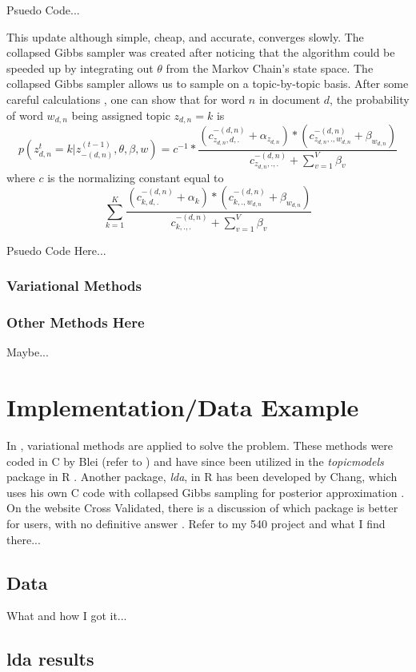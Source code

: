 \documentclass[3p,times]{elsarticle}
\begin{document}
Psuedo Code...

This update although simple, cheap, and accurate, converges slowly. The collapsed Gibbs sampler was created after noticing that the algorithm could be speeded up by integrating out $\theta$ from the Markov Chain's state space. The collapsed Gibbs sampler allows us to sample on a topic-by-topic basis. After some careful calculations \cite{multinom}, one can show that for word $n$ in document $d$, the probability of word $w_{d,n}$ being assigned topic $z_{d,n}=k$ is 
\\
$$
p( z^{t}_{d,n}=k| z^{(t-1)}_{-(d,n)}, \theta, \beta, w) =c^{-1}*\frac{(c^{-(d,n)}_{z_{d,n},d,.}+\alpha_{z_{d,n}})*(c^{-(d,n)}_{z_{d,n},.,w_{d,n}}+\beta_{w_{d,n}})}{c^{-(d,n)}_{z_{d,n},.,.}+\sum_{v=1}^{V}{\beta_{v}}} 
$$
where $c$ is the normalizing constant equal to 
$$
\sum_{k=1}^{K}{\frac{(c^{-(d,n)}_{k,d,.}+\alpha_{k})*(c^{-(d,n)}_{k,.,w_{d,n}}+\beta_{w_{d,n}})}{c^{-(d,n)}_{k,.,.}+\sum_{v=1}^{V}{\beta_{v}}}} 
$$

Psuedo Code Here...
\subsubsection{Variational Methods}


\subsubsection{Other Methods Here}
Maybe...
\section{Implementation/Data Example}
In \cite{lda}, variational methods are applied to solve the problem. These methods were coded in C by Blei (refer to \cite{Ccode}) and have since been utilized in the \textit{topicmodels} package in R \cite{topicsR}. Another package, \textit{lda}, in R has been developed by Chang, which uses his own C code with collapsed Gibbs sampling for posterior approximation \cite{ldaR}. On the website Cross Validated, there is a discussion of which package is better for users, with no definitive answer \cite{STACK}. Refer to my 540 project and what I find there...

\subsection{Data}
What and how I got it...
\subsection{lda results}
\end{document}
